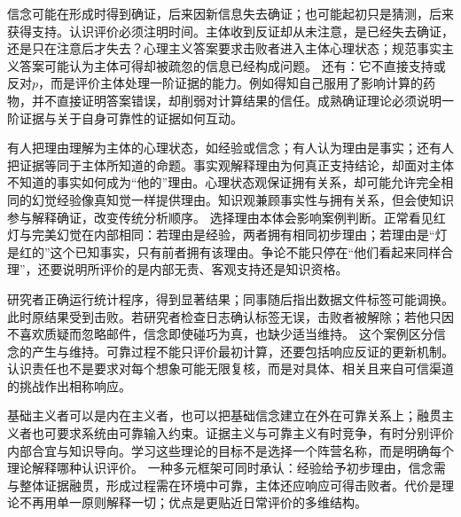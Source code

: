 信念可能在形成时得到确证，后来因新信息失去确证；也可能起初只是猜测，后来获得支持。认识评价必须注明时间。主体收到反证却从未注意，是已经失去确证，还是只在注意后才失去？心理主义答案要求击败者进入主体心理状态；规范事实主义答案可能认为主体可得却被疏忽的信息已经构成问题。 还有：它不直接支持或反对$p$，而是评价主体处理一阶证据的能力。例如得知自己服用了影响计算的药物，并不直接证明答案错误，却削弱对计算结果的信任。成熟确证理论必须说明一阶证据与关于自身可靠性的证据如何互动。

有人把理由理解为主体的心理状态，如经验或信念；有人认为理由是事实；还有人把证据等同于主体所知道的命题\parencite{williamson2000}。事实观解释理由为何真正支持结论，却面对主体不知道的事实如何成为“他的”理由。心理状态观保证拥有关系，却可能允许完全相同的幻觉经验像真知觉一样提供理由。知识观兼顾事实性与拥有关系，但会使知识参与解释确证，改变传统分析顺序。 选择理由本体会影响案例判断。正常看见红灯与完美幻觉在内部相同：若理由是经验，两者拥有相同初步理由；若理由是“灯是红的”这个已知事实，只有前者拥有该理由。争论不能只停在“他们看起来同样合理”，还要说明所评价的是内部无责、客观支持还是知识资格。

研究者正确运行统计程序，得到显著结果；同事随后指出数据文件标签可能调换。此时原结果受到击败。若研究者检查日志确认标签无误，击败者被解除；若他只因不喜欢质疑而忽略邮件，信念即使碰巧为真，也缺少适当维持。 这个案例区分信念的产生与维持。可靠过程不能只评价最初计算，还要包括响应反证的更新机制。认识责任也不是要求对每个想象可能无限复核，而是对具体、相关且来自可信渠道的挑战作出相称响应。

基础主义者可以是内在主义者，也可以把基础信念建立在外在可靠关系上；融贯主义者也可要求系统由可靠输入约束。证据主义与可靠主义有时竞争，有时分别评价内部合宜与知识导向。学习这些理论的目标不是选择一个阵营名称，而是明确每个理论解释哪种认识评价。 一种多元框架可同时承认：经验给予初步理由，信念需与整体证据融贯，形成过程需在环境中可靠，主体还应响应可得击败者。代价是理论不再用单一原则解释一切；优点是更贴近日常评价的多维结构。
